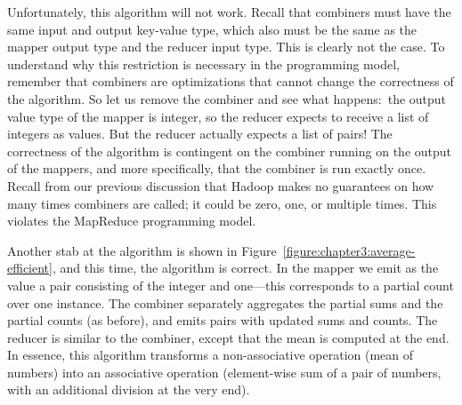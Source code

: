 Unfortunately, this algorithm will not work.  Recall that combiners
must have the same input and output key-value type, which also must be
the same as the mapper output type and the reducer input type.  This
is clearly not the case.  To understand why this restriction is
necessary in the programming model, remember that combiners are
optimizations that cannot change the correctness of the algorithm.  So
let us remove the combiner and see what happens:\ the output value
type of the mapper is integer, so the reducer expects to receive a
list of integers as values.  But the reducer actually expects a list
of pairs!  The correctness of the algorithm is contingent on the
combiner running on the output of the mappers, and more specifically,
that the combiner is run exactly once.  Recall from our previous
discussion that Hadoop makes no guarantees on how many times combiners
are called; it could be zero, one, or multiple times.  This violates
the MapReduce programming model.

Another stab at the algorithm is shown in
Figure~\ref{figure:chapter3:average-efficient}, and this time, the
algorithm is correct.  In the mapper we emit as the value a pair
consisting of the integer and one---this corresponds to a partial
count over one instance.  The combiner separately aggregates the
partial sums and the partial counts (as before), and emits pairs with
updated sums and counts.  The reducer is similar to the combiner,
except that the mean is computed at the end.  In essence, this
algorithm transforms a non-associative operation (mean of numbers)
into an associative operation (element-wise sum of a pair of numbers,
with an additional division at the very end).

